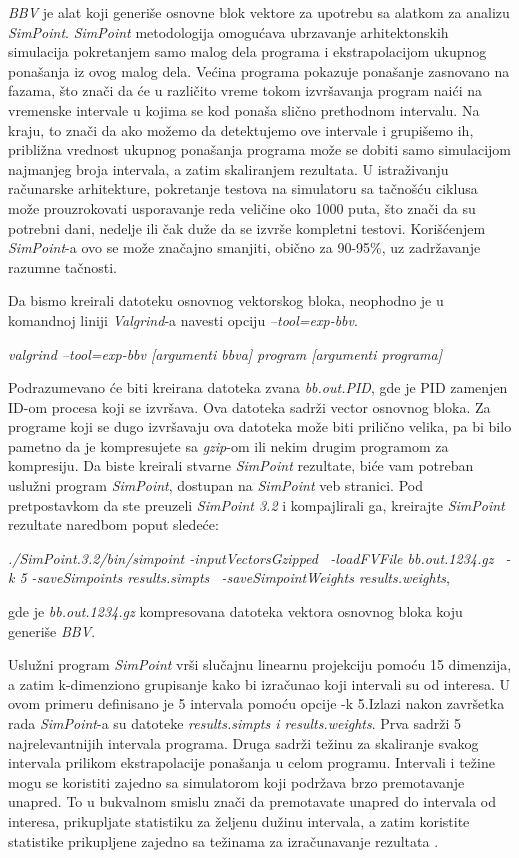 \documentclass[12pt,oneside]{memoir}
\theoremstyle{plain}
\theoremstyle{definition}
\begin{document}
\textit{BBV} je alat koji generiše osnovne blok vektore za upotrebu sa alatkom za analizu \textit{SimPoint}. \textit{SimPoint} metodologija omogućava ubrzavanje arhitektonskih simulacija pokretanjem samo malog dela programa i ekstrapolacijom ukupnog ponašanja iz ovog malog dela. Većina programa pokazuje ponašanje zasnovano na fazama, što znači da će u različito vreme tokom izvršavanja program naići na vremenske intervale u kojima se kod ponaša slično prethodnom intervalu. Na kraju, to znači da ako možemo da detektujemo ove intervale i grupišemo ih, približna vrednost ukupnog ponašanja programa može se dobiti samo simulacijom najmanjeg broja intervala, a zatim skaliranjem rezultata. U istraživanju računarske arhitekture, pokretanje testova na simulatoru sa tačnošću ciklusa može prouzrokovati usporavanje reda veličine oko 1000 puta, što znači da su potrebni dani, nedelje ili čak duže da se izvrše kompletni  testovi. Korišćenjem \textit{SimPoint}-a ovo se može značajno smanjiti, obično za 90-95\%, uz zadržavanje razumne tačnosti.

Da bismo kreirali datoteku osnovnog vektorskog bloka, neophodno je u komandnoj liniji \textit{Valgrind}-a navesti opciju \textit{–tool=exp-bbv}.
\begin{center}
\textit{valgrind --tool=exp-bbv [argumenti bbva] program [argumenti programa]}
\end{center}

Podrazumevano će biti kreirana datoteka zvana \textit{bb.out.PID}, gde je PID zamenjen ID-om procesa koji se izvršava. Ova datoteka sadrži vector osnovnog bloka. Za  programe koji se dugo izvršavaju ova datoteka može biti prilično velika, pa bi bilo pametno da je kompresujete sa \textit{gzip}-om ili nekim drugim programom za kompresiju. Da biste kreirali stvarne \textit{SimPoint} rezultate, biće vam potreban uslužni program \textit{SimPoint}, dostupan na \textit{SimPoint} veb stranici. Pod pretpostavkom da ste preuzeli \textit{SimPoint 3.2} i kompajlirali ga, kreirajte \textit{SimPoint} rezultate naredbom poput sledeće:
\begin{center}
\textit{./SimPoint.3.2/bin/simpoint -inputVectorsGzipped \
    -loadFVFile bb.out.1234.gz \
    -k 5 -saveSimpoints results.simpts \
    -saveSimpointWeights results.weights},
\end{center}
gde je \textit{bb.out.1234.gz} kompresovana datoteka vektora osnovnog bloka koju generiše \textit{BBV}.

Uslužni program \textit{SimPoint} vrši slučajnu linearnu projekciju pomoću 15 dimenzija, a zatim k-dimenziono grupisanje kako bi izračunao koji intervali su od interesa. U ovom primeru definisano je 5 intervala pomoću opcije -k 5.Izlazi nakon završetka rada \textit{SimPoint}-a su datoteke \textit{results.simpts i results.weights}. Prva sadrži 5 najrelevantnijih intervala programa. Druga  sadrži težinu za skaliranje svakog intervala prilikom ekstrapolacije ponašanja u celom programu. Intervali i težine mogu se koristiti zajedno sa simulatorom koji podržava brzo premotavanje unapred. To u bukvalnom smislu znači da premotavate unapred do intervala od interesa, prikupljate statistiku za željenu dužinu intervala, a zatim koristite statistike prikupljene zajedno sa težinama za izračunavanje rezultata \cite{BBV}. 
\end{document}
